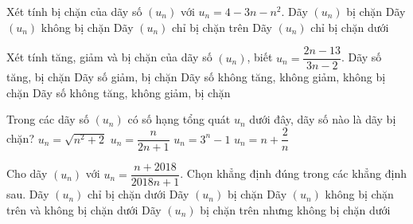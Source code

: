 \begin{ex}%
	Xét tính bị chặn của dãy số  $(u_n)$ với $u_n=4-3n-n^2$.
	 \choice
		{Dãy $(u_n)$ bị chặn} 
		{Dãy $(u_n)$ không bị chặn} 
		{\True Dãy $(u_n)$ chỉ bị chặn  trên}
		 {Dãy $(u_n)$ chỉ bị chặn dưới}
\end{ex}

\begin{ex}%
	Xét tính tăng, giảm và bị chặn của  dãy số $(u_n)$, biết $u_n=\dfrac{2n-13}{3n-2}$.
	\choice 
		{\True Dãy số tăng, bị  chặn}
		{Dãy  số giảm, bị chặn}
		{Dãy số không tăng, không giảm,  không bị chặn}
		{Dãy số không  tăng, không giảm, bị chặn}
\end{ex}

\begin{ex}%
	Trong các dãy số $\left(u_n\right)$ có  số hạng tổng quát $u_n$ dưới đây, dãy số nào là dãy bị chặn?
	\choice 
		{$u_n=\sqrt{n^2+2}$} 
		{\True $u_n=\dfrac{n}{2n+1}$} 
		{$u_n=3^n-1$} 
		 {$u_n=n+\dfrac{2}{n}$}
\end{ex}

\begin{ex}%
	Cho dãy $\left(u_n\right)$ với $u_n=\dfrac{n+2018}{2018n+1}$. Chọn  khẳng định đúng trong các khẳng định sau.
	 \choice
		{Dãy  $\left(u_n\right)$ chỉ bị chặn dưới}
		{\True Dãy $\left(u_n\right)$ bị chặn} 
		{Dãy $\left(u_n\right)$ không bị  chặn trên và không bị chặn dưới}
		{Dãy  $\left(u_n\right)$ bị chặn trên nhưng không bị chặn dưới}
\end{ex}

